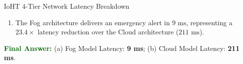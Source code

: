 \documentclass[11pt,a4paper,openany]{report}
\newcommand{\Answer}{\par\textbf{\textcolor{darkgreen}{Final Answer:}} }
\begin{document}
\begin{solved}{IoHT 4-Tier Network Latency Breakdown}
\begin{enumerate}[leftmargin=*]
  \begin{equation}
  T_{\text{up}} = 1 + 2 + 2 + 100 = 105\text{ ms}
  \end{equation}
  \begin{equation}
  T_{\text{down}} = 100 + 2 + 2 + 1 = 105\text{ ms}
  \end{equation}
  \begin{equation}
  T_{\text{cloud}} = T_{\text{up}} + T_{\text{proc, cloud}} + T_{\text{down}} = 105\text{ ms} + 1\text{ ms} + 105\text{ ms} = 211\text{ ms}
  \end{equation}
  \item The Fog architecture delivers an emergency alert in \textbf{$9\text{ ms}$}, representing a $23.4\times$ latency reduction over the Cloud architecture (\textbf{$211\text{ ms}$}).
\end{enumerate}
\Answer (a) Fog Model Latency: \textbf{9 ms}; (b) Cloud Model Latency: \textbf{211 ms}.
\end{solved}
\end{document}
